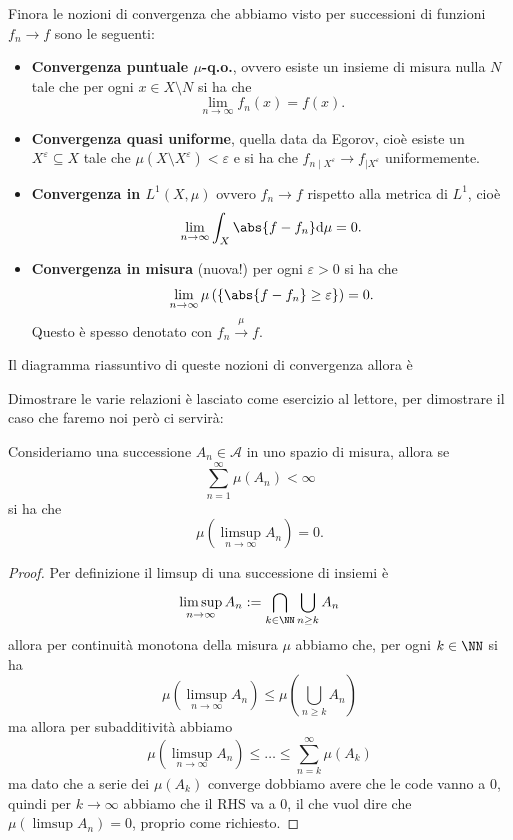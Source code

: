 \documentclass[11pt]{scrartcl}
\newcommand{\dif}{\text{d}}
\begin{document}
	Finora le nozioni di convergenza che abbiamo visto per successioni di funzioni $f_n\to f$ sono le seguenti:
	\begin{itemize}
		\item \textbf{Convergenza puntuale $\mu$-q.o.}, ovvero esiste un insieme di misura nulla $N$ tale che per ogni $x\in X\setminus N$ si ha che
		$$\lim_{n\to\infty}f_n(x)=f(x).$$
		\item \textbf{Convergenza quasi uniforme}, quella data da Egorov, cioè esiste un $X^\varepsilon\subseteq X$ tale che $\mu(X\setminus X^\varepsilon)<\varepsilon$ e si ha che $f_{n\mid X^\varepsilon}\to f_{\mid X^\varepsilon}$ uniformemente.
		\item \textbf{Convergenza in $L^1(X,\mu)$} ovvero $f_n\to f$ rispetto alla metrica di $L^1$, cioè
		$$\lim_{n\to\infty}\int_{X}\abs{f-f_n}\dif \mu=0.$$
		\item \textbf{Convergenza in misura} (nuova!) per ogni $\varepsilon>0$ si ha che
		$$\lim_{n\to\infty}\mu\left(\left\{\abs{f-f_n}\ge \varepsilon\right\}\right)=0.$$
		Questo è spesso denotato con $f_n\overset{\mu}{\to} f$. 
	\end{itemize}
	Il diagramma riassuntivo di queste nozioni di convergenza allora è 
	\begin{center}
	\end{center}
	Dimostrare le varie relazioni è lasciato come esercizio al lettore, per dimostrare il caso che faremo noi però ci servirà:
	\begin{lemma}
		Consideriamo una successione $A_n\in\mathcal{A}$ in uno spazio di misura, allora se 
		$$\sum_{n=1}^\infty \mu(A_n)<\infty$$
		si ha che
		$$\mu\left(\limsup_{n\to\infty}A_n\right)=0.$$
	\end{lemma}
	\begin{proof}
		Per definizione il limsup di una successione di insiemi è
		$$\limsup_{n\to\infty}A_n:=\bigcap_{k\in\NN}\bigcup_{n\ge k}A_n$$
		allora per continuità monotona della misura $\mu$ abbiamo che, per ogni $k\in\NN$ si ha
		$$\mu\left(\limsup_{n\to\infty}A_n\right)\le \mu\left(\bigcup_{n\ge k}A_n\right)$$
		ma allora per subadditività abbiamo
		$$\mu\left(\limsup_{n\to\infty}A_n\right)\le \dots \le \sum_{n=k}^\infty\mu(A_k)$$
		ma dato che a serie dei $\mu(A_k)$ converge dobbiamo avere che le code vanno a $0$, quindi per $k\to\infty$ abbiamo che il RHS va a $0$, il che vuol dire che $\mu(\limsup A_n)=0$, proprio come richiesto.
	\end{proof}
\end{document}
